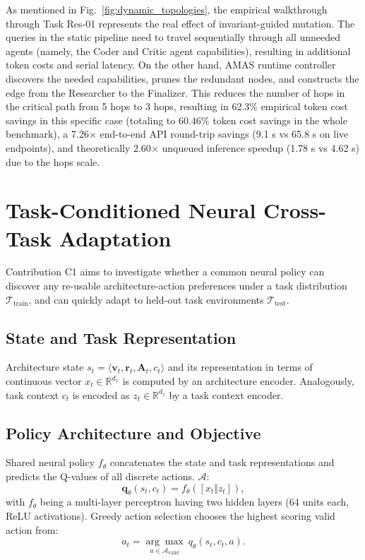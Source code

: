 \documentclass[conference]{IEEEtran}
\begin{document}
As mentioned in Fig.~\ref{fig:dynamic_topologies}, the empirical walkthrough through Task Res-01 represents the real effect of invariant-guided mutation. The queries in the static pipeline need to travel sequentially through all unneeded agents (namely, the Coder and Critic agent capabilities), resulting in additional token costs and serial latency. On the other hand, AMAS runtime controller discovers the needed capabilities, prunes the redundant nodes, and constructs the edge from the Researcher to the Finalizer. This reduces the number of hops in the critical path from 5 hops to 3 hops, resulting in 62.3\% empirical token cost savings in this specific case (totaling to 60.46\% token cost savings in the whole benchmark), a 7.26$\times$ end-to-end API round-trip savings (9.1 s vs 65.8 s on live endpoints), and theoretically 2.60$\times$ unqueued inference speedup (1.78 s vs 4.62 s) due to the hops scale.

\section{Task-Conditioned Neural Cross-Task Adaptation}
\label{sec:neural_adaptation}

Contribution C1 aims to investigate whether a common neural policy can discover any re-usable architecture-action preferences under a task distribution $\mathcal{T}_{\mathrm{train}}$, and can quickly adapt to held-out task environments $\mathcal{T}_{\mathrm{test}}$.

\subsection{State and Task Representation}
Architecture state $s_t = \langle \mathbf{v}_t, \mathbf{r}_t, \mathbf{A}_t, c_t \rangle$ and its representation in terms of continuous vector $x_t \in \mathbb{R}^{d_x}$ is computed by an architecture encoder. Analogously, task context $c_t$ is encoded as $z_t \in \mathbb{R}^{d_z}$ by a task context encoder.

\subsection{Policy Architecture and Objective}
Shared neural policy $f_\theta$ concatenates the state and task representations and predicts the Q-values of all discrete actions. $\mathcal{A}$:
\begin{equation}
\mathbf{q}_\theta(s_t, c_t) = f_\theta([x_t \Vert z_t]),
\end{equation}
with $f_\theta$ being a multi-layer perceptron having two hidden layers (64 units each, ReLU activations). Greedy action selection chooses the highest scoring valid action from:
\begin{equation}
a_t = \underset{a \in \mathcal{A}_{\mathrm{valid}}}{\arg\max} \ q_\theta(s_t, c_t, a).
\end{equation}
\end{document}
